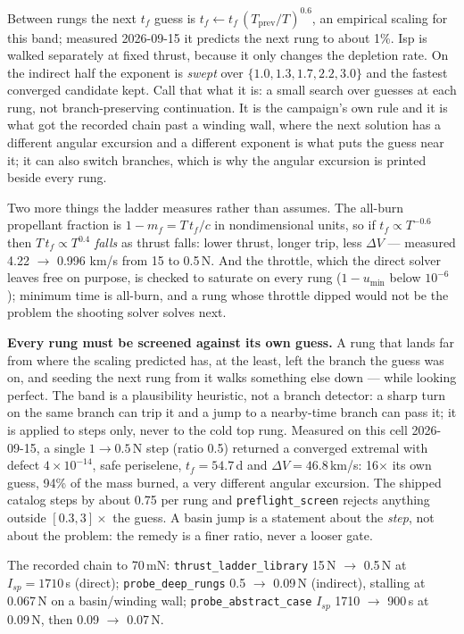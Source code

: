 \documentclass[11pt]{article}
\newcommand{\tf}{t_f}\newcommand{\R}{\mathbb{R}}
\newcommand{\file}[1]{\texttt{#1}}
\begin{document}
\begin{rig}
Between rungs the next $\tf$ guess is $\tf \leftarrow \tf\,(T_{\text{prev}} /
T)^{0.6}$, an empirical scaling for this band; measured 2026-09-15 it
predicts the next rung to about 1\%. Isp is walked separately at fixed
thrust, because it only changes the depletion rate. On the indirect half the
exponent is \emph{swept} over $\{1.0, 1.3, 1.7, 2.2, 3.0\}$ and the fastest
converged candidate kept. Call that what it is: a small search over guesses
at each rung, not branch-preserving continuation. It is the campaign's own
rule and it is what got the recorded chain past a winding wall, where the
next solution has a different angular excursion and a different exponent is
what puts the guess near it; it can also switch branches, which is why the
angular excursion is printed beside every rung.

Two more things the ladder measures rather than assumes. The all-burn
propellant fraction is $1 - m_f = T\,\tf / c$ in nondimensional units, so if
$\tf \propto T^{-0.6}$ then $T\,\tf \propto T^{0.4}$ \emph{falls} as thrust
falls: lower thrust, longer trip, less $\Delta V$ --- measured 4.22 $\to$ 0.996
km/s from 15 to 0.5\,N. And the throttle, which the direct solver leaves
free on purpose, is checked to saturate on every rung ($1 - u_{\min}$ below
$10^{-6}$); minimum time is all-burn, and a rung whose throttle dipped would
not be the problem the shooting solver solves next.

\textbf{Every rung must be screened against its own guess.} A rung that lands
far from where the scaling predicted has, at the least, left the branch the
guess was on, and seeding the next rung from it walks something else down
--- while looking perfect. The band is a plausibility heuristic, not a branch
detector: a sharp turn on the same branch can trip it and a jump to a
nearby-time branch can pass it; it is applied to steps only, never to the
cold top rung.
Measured on this cell 2026-09-15, a single $1 \to 0.5$\,N step (ratio 0.5)
returned a converged extremal with defect $4\times10^{-14}$, safe periselene,
$\tf = 54.7$\,d and $\Delta V = 46.8$\,km/s: 16$\times$ its own guess, 94\% of
the mass burned, a very different angular excursion. The shipped catalog steps by
about 0.75 per rung and \file{preflight\_screen} rejects anything outside
$[0.3, 3]\times$ the guess. A basin jump is a statement about the \emph{step},
not about the problem: the remedy is a finer ratio, never a looser gate.

The recorded chain to 70\,mN: \file{thrust\_ladder\_library} 15\,N $\to$
0.5\,N at $I_{sp}=1710$\,s (direct); \file{probe\_deep\_rungs} 0.5 $\to$
0.09\,N (indirect), stalling at 0.067\,N on a basin/winding wall;
\file{probe\_abstract\_case} $I_{sp}$ 1710 $\to$ 900\,s at 0.09\,N, then
0.09 $\to$ 0.07\,N.
\end{rig}
\end{document}
